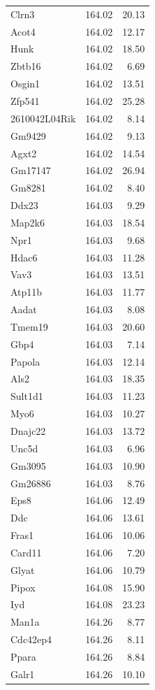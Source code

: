 \documentclass[oneside]{book}\usepackage[]{graphicx}\usepackage[]{color}
\begin{document}
{\begin{longtable}{lrr}
  Clrn3 & 164.02 & 20.13 \\
  Acot4 & 164.02 & 12.17 \\
  Hunk & 164.02 & 18.50 \\
  Zbtb16 & 164.02 & 6.69 \\
  Osgin1 & 164.02 & 13.51 \\
  Zfp541 & 164.02 & 25.28 \\
  2610042L04Rik & 164.02 & 8.14 \\
  Gm9429 & 164.02 & 9.13 \\
  Agxt2 & 164.02 & 14.54 \\
  Gm17147 & 164.02 & 26.94 \\
  Gm8281 & 164.02 & 8.40 \\
  Ddx23 & 164.03 & 9.29 \\
  Map2k6 & 164.03 & 18.54 \\
  Npr1 & 164.03 & 9.68 \\
  Hdac6 & 164.03 & 11.28 \\
  Vav3 & 164.03 & 13.51 \\
  Atp11b & 164.03 & 11.77 \\
  Aadat & 164.03 & 8.08 \\
  Tmem19 & 164.03 & 20.60 \\
  Gbp4 & 164.03 & 7.14 \\
  Papola & 164.03 & 12.14 \\
  Als2 & 164.03 & 18.35 \\
  Sult1d1 & 164.03 & 11.23 \\
  Myo6 & 164.03 & 10.27 \\
  Dnajc22 & 164.03 & 13.72 \\
  Unc5d & 164.03 & 6.96 \\
  Gm3095 & 164.03 & 10.90 \\
  Gm26886 & 164.03 & 8.76 \\
  Eps8 & 164.06 & 12.49 \\
  Ddc & 164.06 & 13.61 \\
  Fras1 & 164.06 & 10.06 \\
  Card11 & 164.06 & 7.20 \\
  Glyat & 164.06 & 10.79 \\
  Pipox & 164.08 & 15.90 \\
  Iyd & 164.08 & 23.23 \\
  Man1a & 164.26 & 8.77 \\
  Cdc42ep4 & 164.26 & 8.11 \\
  Ppara & 164.26 & 8.84 \\
  Galr1 & 164.26 & 10.10 \\

\end{longtable}}
\end{document}
